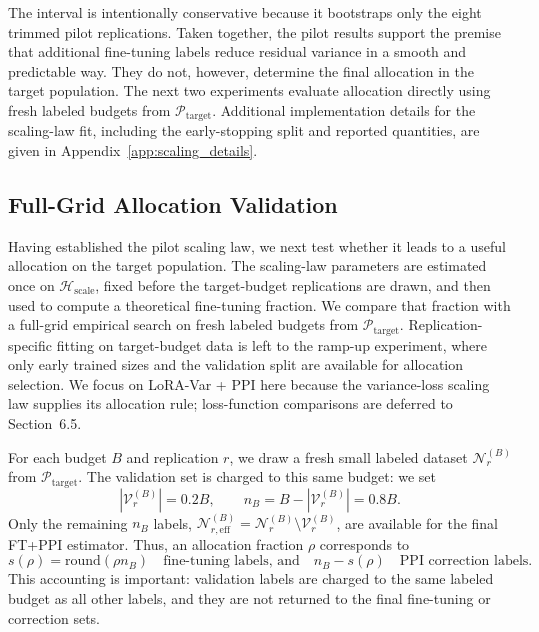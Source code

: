 \documentclass[11pt]{article}
\begin{document}
The interval is intentionally conservative because it bootstraps only the eight trimmed pilot
replications.
Taken together, the pilot results support the premise that additional fine-tuning labels reduce
residual variance in a smooth and predictable way. They do not, however, determine the final
allocation in the target population. The next two experiments evaluate allocation directly using
fresh labeled budgets from $\mathcal{P}_{\mathrm{target}}$. Additional implementation details for the scaling-law fit,
including the early-stopping split and reported quantities, are given in
Appendix~\ref{app:scaling_details}.

\subsection{Full-Grid Allocation Validation}
\label{subsec:full_grid_allocation}

Having established the pilot scaling law, we next test whether it leads to a useful allocation on
the target population. The scaling-law parameters are estimated once on
$\mathcal{H}_{\mathrm{scale}}$, fixed before the target-budget replications are drawn, and then
used to compute a theoretical fine-tuning fraction. We compare that fraction with a full-grid
empirical search on fresh labeled budgets from
$\mathcal{P}_{\mathrm{target}}$. Replication-specific fitting on target-budget data is left to
the ramp-up experiment, where only early trained sizes and the validation split are available for
allocation selection. We focus on LoRA-Var + PPI here because the variance-loss scaling law
supplies its allocation rule; loss-function comparisons are deferred to Section~6.5.

For each budget $B$ and replication $r$, we draw a fresh small labeled dataset
$\mathcal{N}_r^{(B)}$ from $\mathcal{P}_{\mathrm{target}}$. The validation set is charged to this
same budget: we set
\[
    |\mathcal{V}_r^{(B)}|=0.2B,
    \qquad
    n_B
    =
    B-|\mathcal{V}_r^{(B)}|
    =
    0.8B .
\]
Only the remaining $n_B$ labels,
$\mathcal{N}_{r,\mathrm{eff}}^{(B)}
=\mathcal{N}_r^{(B)}\setminus\mathcal{V}_r^{(B)}$, are available for the final FT+PPI estimator.
Thus, an allocation fraction $\rho$ corresponds to
\[
    s(\rho)=\mathrm{round}(\rho n_B)
    \quad\text{fine-tuning labels, and}\quad
    n_B-s(\rho)
    \quad\text{PPI correction labels}.
\]
This accounting is important: validation labels are charged to the same labeled budget as all
other labels, and they are not returned to the final fine-tuning or correction sets.
\end{document}
